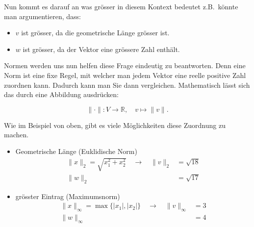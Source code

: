 \vspace{0.25\baselineskip}

Nun kommt es darauf an was grösser in diesem Kontext bedeutet z.B.\ könnte man argumentieren, dass:

\begin{itemize}
    \item \( v \) ist grösser, da die geometrische Länge grösser ist.
    \item \( w \) ist grösser, da der Vektor eine grössere Zahl enthält.
\end{itemize}

Normen werden uns nun helfen diese Frage eindeutig zu beantworten. Denn eine Norm ist eine fixe Regel, mit welcher man jedem Vektor eine reelle positive Zahl zuordnen kann. Dadurch kann man Sie dann vergleichen. Mathematisch lässt sich das durch eine Abbildung ausdrücken:

\begin{equation*}
    \| {\cdot} \| : V \rightarrow \mathbb{R}, \quad v \mapsto \| v \|.
\end{equation*}

\vspace{0.25\baselineskip}

Wie im Beispiel von oben, gibt es viele Möglichkeiten diese Zuordnung zu machen. 

\begin{itemize}
    \item Geometrische Länge (Euklidische Norm)
        \begin{equation*}
            \begin{aligned}
                \| x \|_2 = \sqrt{x_1^2 + x_2^2} \quad \to \quad \| v \|_2 &= \sqrt{18} \\
                \| w \|_2 &= \sqrt{17}
            \end{aligned}        
        \end{equation*}
    \item grösster Eintrag (Maximumsnorm)
        \begin{equation*}
            \begin{aligned}
                \| x \|_\infty = \max \{ |x_1|, |x_2| \} \quad \to \quad \| v \|_\infty &= 3 \\
                \| w \|_\infty &= 4
            \end{aligned}        
        \end{equation*}
\end{itemize}

